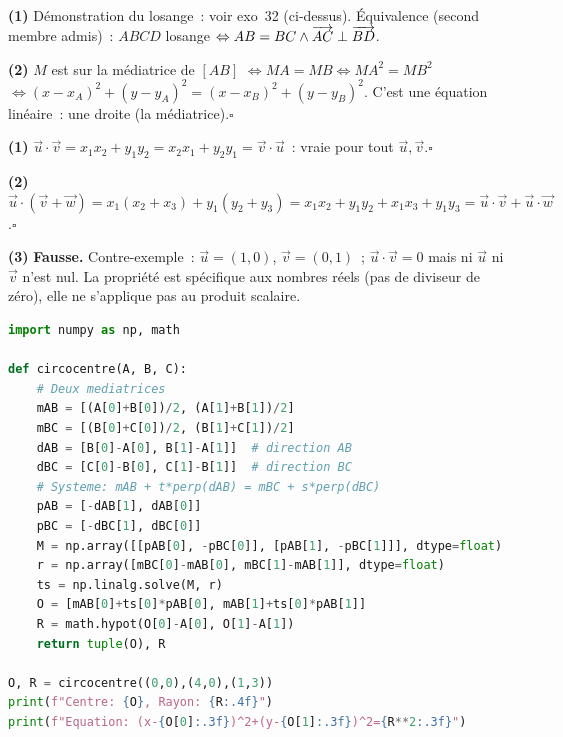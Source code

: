 
\textbf{(1)} D\'emonstration du losange~: voir exo~32 (ci-dessus).
\'Equivalence (second membre admis)~:
$ABCD$ losange $\Leftrightarrow AB=BC\wedge\overrightarrow{AC}\perp\overrightarrow{BD}$.

\textbf{(2)} $M$ est sur la m\'ediatrice de $[AB]$
$\Leftrightarrow MA=MB\Leftrightarrow MA^2=MB^2$
$\Leftrightarrow(x-x_A)^2+(y-y_A)^2=(x-x_B)^2+(y-y_B)^2$.
C'est une \'equation lin\'eaire~: une droite (la m\'ediatrice).\hfill$\square$


\textbf{(1)} $\vec{u}\cdot\vec{v}=x_1x_2+y_1y_2=x_2x_1+y_2y_1=\vec{v}\cdot\vec{u}$~:
vraie pour tout $\vec{u},\vec{v}$.\hfill$\square$

\textbf{(2)} $\vec{u}\cdot(\vec{v}+\vec{w})=x_1(x_2+x_3)+y_1(y_2+y_3)
=x_1x_2+y_1y_2+x_1x_3+y_1y_3=\vec{u}\cdot\vec{v}+\vec{u}\cdot\vec{w}$.\hfill$\square$

\textbf{(3)} \textbf{Fausse.} Contre-exemple~: $\vec{u}=(1,0)$, $\vec{v}=(0,1)$~;
$\vec{u}\cdot\vec{v}=0$ mais ni $\vec{u}$ ni $\vec{v}$ n'est nul.
La propri\'et\'e est sp\'ecifique aux nombres r\'eels (\og pas de diviseur de z\'ero\fg),
elle ne s'applique pas au produit scalaire.


\begin{lstlisting}[language=Python]
import numpy as np, math

def circocentre(A, B, C):
    # Deux mediatrices
    mAB = [(A[0]+B[0])/2, (A[1]+B[1])/2]
    mBC = [(B[0]+C[0])/2, (B[1]+C[1])/2]
    dAB = [B[0]-A[0], B[1]-A[1]]  # direction AB
    dBC = [C[0]-B[0], C[1]-B[1]]  # direction BC
    # Systeme: mAB + t*perp(dAB) = mBC + s*perp(dBC)
    pAB = [-dAB[1], dAB[0]]
    pBC = [-dBC[1], dBC[0]]
    M = np.array([[pAB[0], -pBC[0]], [pAB[1], -pBC[1]]], dtype=float)
    r = np.array([mBC[0]-mAB[0], mBC[1]-mAB[1]], dtype=float)
    ts = np.linalg.solve(M, r)
    O = [mAB[0]+ts[0]*pAB[0], mAB[1]+ts[0]*pAB[1]]
    R = math.hypot(O[0]-A[0], O[1]-A[1])
    return tuple(O), R

O, R = circocentre((0,0),(4,0),(1,3))
print(f"Centre: {O}, Rayon: {R:.4f}")
print(f"Equation: (x-{O[0]:.3f})^2+(y-{O[1]:.3f})^2={R**2:.3f}")
\end{lstlisting}

